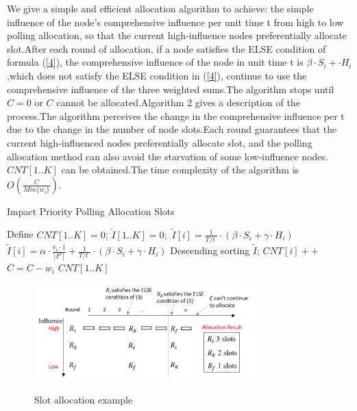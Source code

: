 \documentclass[conference]{IEEEtran}
\begin{document}
We give a simple and efficient allocation algorithm to achieve: the simple influence of the node's comprehensive influence per unit time t from high to low polling allocation, so that the current high-influence nodes preferentially allocate slot.After each round of allocation, if a node satisfies the ELSE condition of formula (\ref{4}), the comprehensive influence of the node in unit time t is $\beta \cdot S_i + \cdot H_i$,which does not satisfy the ELSE condition in (\ref{4}), continue to use the comprehensive influence of the three weighted sums.The algorithm stops until $C = 0$ or $C$ cannot be allocated.Algorithm 2 gives a description of the process.The algorithm perceives the change in the comprehensive influence per t due to the change in the number of node slots.Each round guarantees that the current high-influenced nodes preferentially allocate slot, and the polling allocation method can also avoid the starvation of some low-influence nodes. $CNT[1..K]$ can be obtained.The time complexity of the algorithm is $O(\frac{C}{Min\{w_i\}})$.


\begin{algorithm}[h]
\caption{Impact Priority Polling Allocation Slots}
\begin{algorithmic}[1]
\STATE Define $CNT[1..K] = 0$;   $\widetilde{I}[1..K] = 0;$
\STATE  $ \widetilde{I}[i]  = \frac{1}{{T}/{t}\;}\cdot (\beta \cdot {{S}_{i}}+\gamma \cdot {{H}_{i}})$ 
\ELSE 
\STATE  $ \widetilde{I}[i]  = \alpha \cdot \frac{{{v}_{i}\cdot 1}}{\left| {{F}^{c}} \right|}+\frac{1}{{T}/{t}\;} \cdot (\beta \cdot {{S}_{i}}+\gamma \cdot {{H}_{i}})$
\ENDIF
\ENDFOR
\STATE Descending sorting $ \widetilde{I}  $;
\STATE $CNT[i]++$
\STATE $C = C - w_i $
\ENDIF
\ENDFOR
\ENDWHILE
\RETURN $CNT[1..K]$
\label{code:recentEnd}
\end{algorithmic}
\end{algorithm}

\begin{figure}[!!!!!!!!!!!!!!hhhhhhhhhht]
\centering

\includegraphics[width=8.5cm]{images/slot_allocation.png}
\label{fig_slot}

\caption{Slot allocation example}
\label{fig_model}
\end{figure}
\end{document}
